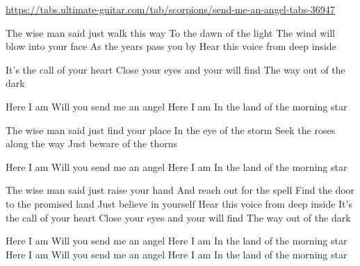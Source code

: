 
\url{https://tabs.ultimate-guitar.com/tab/scorpions/send-me-an-angel-tabs-36947}

The wise man said just walk this way
To the dawn of the light
The wind will blow into your face
As the years pass you by
Hear this voice from deep inside

It's the call of your heart
Close your eyes and your will find
The way out of the dark

Here I am
Will you send me an angel
Here I am
In the land of the morning star

The wise man said just find your place
In the eye of the storm
Seek the roses along the way
Just beware of the thorns

Here I am
Will you send me an angel
Here I am
In the land of the morning star


The wise man said just raise your hand
And reach out for the spell
Find the door to the promised land
Just believe in yourself
Hear this voice from deep inside
It's the call of your heart
Close your eyes and your will find
The way out of the dark

Here I am
Will you send me an angel
Here I am
In the land of the morning star
Here I am
Will you send me an angel
Here I am
In the land of the morning star
